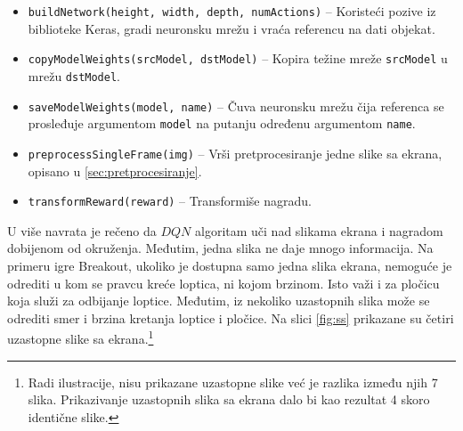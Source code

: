 \begin{itemize}
	\item \texttt{buildNetwork(height, width, depth, numActions)} -- Koristeći pozive iz biblioteke Keras, gradi neuronsku mrežu i vraća referencu na dati objekat.
	\item \texttt{copyModelWeights(srcModel, dstModel)} -- Kopira težine mreže \texttt{srcModel} u mrežu \texttt{dstModel}.
	\item \texttt{saveModelWeights(model, name)} -- Čuva neuronsku mrežu čija referenca se prosleđuje argumentom \texttt{model} na putanju određenu argumentom \texttt{name}.
	\item \texttt{preprocessSingleFrame(img)} -- Vrši pretprocesiranje jedne slike sa ekrana, opisano u \ref{sec:pretprocesiranje}.
	\item \texttt{transformReward(reward)} -- Transformiše nagradu.
\end{itemize}
\par 
U više navrata je rečeno da $DQN$ algoritam uči nad slikama ekrana i nagradom dobijenom od okruženja. Međutim, jedna slika ne daje mnogo informacija. Na primeru igre Breakout, ukoliko je dostupna samo jedna slika ekrana, nemoguće je odrediti u kom se pravcu kreće loptica, ni kojom brzinom. Isto važi i za pločicu koja služi za odbijanje loptice. Međutim, iz nekoliko uzastopnih slika može se odrediti smer i brzina kretanja loptice i pločice. Na slici \ref{fig:ss} prikazane su četiri uzastopne slike sa ekrana.\footnote{Radi ilustracije, nisu prikazane uzastopne slike već je razlika između njih 7 slika. Prikazivanje uzastopnih slika sa ekrana dalo bi kao rezultat 4 skoro identične slike.} 


